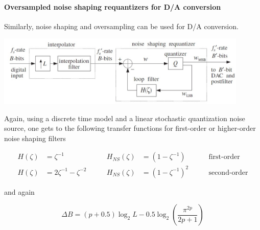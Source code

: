 \paragraph{Oversampled noise shaping requantizers for D/A conversion}
Similarly, noise shaping and oversampling can be used for D/A conversion.

\begin{center}
	\includegraphics[width=12cm]{images/IntDecOv_Requantizer.jpg}
\end{center}

Again, using a discrete time model and a linear stochastic quantization
noise source, one gets to the following transfer functions for first-order 
or higher-order noise shaping filters

\begin{align*}
	H(\zeta) &= \zeta^{-1} \qquad &
	H_{NS}(\zeta) &= (1-\zeta^{-1}) \qquad
	& \text{first-order} \\
	H(\zeta) &= 2 \zeta^{-1} - \zeta^{-2} \qquad &
	H_{NS}(\zeta) &= (1-\zeta^{-1})^2 \qquad
	& \text{second-order}
\end{align*}

and again

\begin{equation*}
	\Delta B = (p+0.5) \log_2 L - 0.5 \log_2\left(\frac{\pi^{2p}}{2p+1}\right)
\end{equation*}